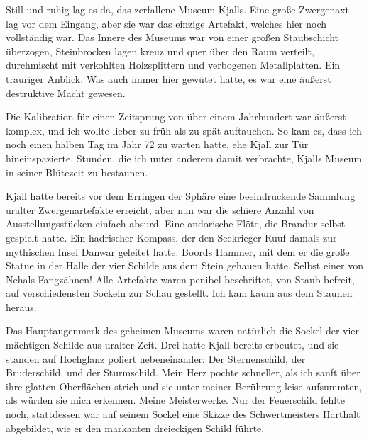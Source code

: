 \documentclass[10pt, a4paper, oneside]{book}
\begin{document}
Still und ruhig lag es da, das zerfallene Museum Kjalls. Eine große Zwergenaxt lag vor dem Eingang, aber sie war das einzige Artefakt, welches hier noch vollständig war. Das Innere des Museums war von einer großen Staubschicht überzogen, Steinbrocken lagen kreuz und quer über den Raum verteilt, durchmischt mit verkohlten Holzsplittern und verbogenen Metallplatten. Ein trauriger Anblick. Was auch immer hier gewütet hatte, es war eine äußerst destruktive Macht gewesen.

Die Kalibration für einen Zeitsprung von über einem Jahrhundert war äußerst komplex, und ich wollte lieber zu früh als zu spät auftauchen. So kam es, dass ich noch einen halben Tag im Jahr 72 zu warten hatte, ehe Kjall zur Tür hineinspazierte. Stunden, die ich unter anderem damit verbrachte, Kjalls Museum in seiner Blütezeit zu bestaunen.

Kjall hatte bereits vor dem Erringen der Sphäre eine beeindruckende Sammlung uralter Zwergenartefakte erreicht, aber nun war die schiere Anzahl von Ausstellungsstücken einfach absurd. Eine andorische Flöte, die Brandur selbst gespielt hatte. Ein hadrischer Kompass, der den Seekrieger Ruuf damals zur mythischen Insel Danwar geleitet hatte. Boords Hammer, mit dem er die große Statue in der Halle der vier Schilde aus dem Stein gehauen hatte. Selbst einer von Nehals Fangzähnen! Alle Artefakte waren penibel beschriftet, von Staub befreit, auf verschiedensten Sockeln zur Schau gestellt. Ich kam kaum aus dem Staunen heraus.

Das Hauptaugenmerk des geheimen Museums waren natürlich die Sockel der vier mächtigen Schilde aus uralter Zeit. Drei hatte Kjall bereits erbeutet, und sie standen auf Hochglanz poliert nebeneinander: Der Sternenschild, der Bruderschild, und der Sturmschild. Mein Herz pochte schneller, als ich sanft über ihre glatten Oberflächen strich und sie unter meiner Berührung leise aufsummten, als würden sie mich erkennen. Meine Meisterwerke. Nur der Feuerschild fehlte noch, stattdessen war auf seinem Sockel eine Skizze des Schwertmeisters Harthalt abgebildet, wie er den markanten dreieckigen Schild führte.
\end{document}
